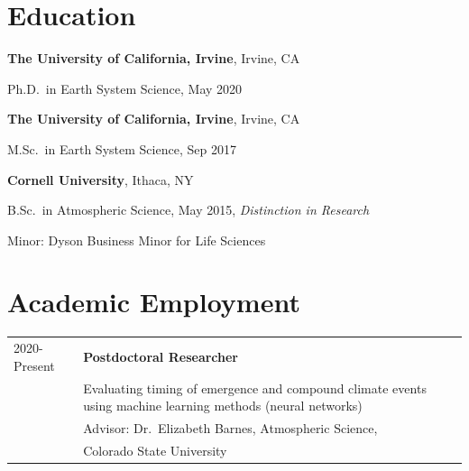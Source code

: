 \documentclass[margin,line,palatino,courier,10pt]{res}
\newenvironment{list1}{
  \begin{list}{\ding{113}}{%
      \setlength{\itemsep}{0in}
      \setlength{\parsep}{0in} \setlength{\parskip}{0in}
      \setlength{\topsep}{0in} \setlength{\partopsep}{0in}
      \setlength{\leftmargin}{0.17in}}}{\end{list}}
\begin{document}
\begin{resume}
\section{\sc \large{\textcolor{Cerulean}{\textbf{Education}}}}

{\bf The University of California, Irvine}, Irvine, CA\\
\vspace*{-.12in}
\begin{list1}
\item[] Ph.D.~in Earth System Science, May 2020
\end{list1}

{\bf The University of California, Irvine}, Irvine, CA\\
\vspace*{-.12in}
\begin{list1}
\item[] M.Sc.~in Earth System Science, Sep 2017
\end{list1}

{\bf Cornell University}, Ithaca, NY\\
\vspace*{-.12in}
\begin{list1}
\item[] B.Sc.~in Atmospheric Science, May 2015, \textit{Distinction in Research}

\hspace*{0.2in}  Minor: Dyson Business Minor for Life Sciences

\end{list1}

\section{\sc \textcolor{Cerulean}{\large{\textbf{Academic Employment}}}}
\vspace*{0.05in}
\begin{tabular}{@{}p{0.9in}p{4in}}
2020-Present & \textbf{Postdoctoral Researcher}\\
& Evaluating timing of emergence and compound climate events using machine learning methods (neural networks)\\
& \hspace{0.2in} Advisor: Dr.\ Elizabeth Barnes, Atmospheric Science,\\
& \vspace{-0.18in}\hspace{0.2in} Colorado State University\\


\end{tabular}
\end{resume}
\end{document}
